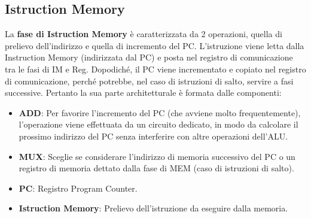 \subsection{Istruction Memory}
La \textbf{fase di Istruction Memory} è caratterizzata da 2 operazioni, quella di prelievo dell'indirizzo e quella di incremento del PC. L'istruzione viene letta dalla Instruction Memory (indirizzata dal PC) e posta nel registro di comunicazione tra le fasi di IM e Reg. Dopodiché, il PC viene incrementato e copiato nel registro di comunicazione, perché potrebbe, nel caso di istruzioni di salto, servire a fasi successive.
Pertanto la sua parte architetturale è formata dalle componenti:
\begin{itemize}
    \item \textbf{ADD}: Per favorire l'incremento del PC (che avviene molto frequentemente), l'operazione viene effettuata da un circuito dedicato, in modo da calcolare il prossimo indirizzo del PC senza interferire con altre operazioni dell'ALU.
    \item \textbf{MUX}: Sceglie se considerare l'indirizzo di memoria successivo del PC o un registro di memoria dettato dalla fase di MEM (caso di istruzioni di salto).
    \item \textbf{PC}: Registro Program Counter.
    \item \textbf{Istruction Memory}: Prelievo dell'istruzione da eseguire dalla memoria.
\end{itemize}

